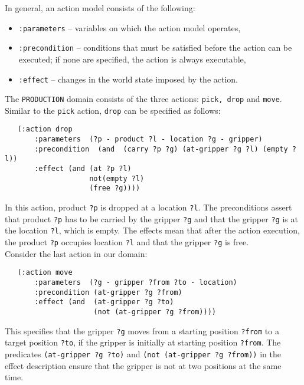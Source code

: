 In general, an action model consists of the following:
\begin{itemize}
\item \texttt{:parameters} -- variables on which the action model operates,
\item \texttt{:precondition} -- conditions that must be satisfied before the action can be executed; if none are specified, the action is always executable,
\item \texttt{:effect} -- changes in the world state imposed by the action.
\end{itemize}
The \texttt{PRODUCTION} domain consists of the three actions: \texttt{pick, drop} and \texttt{move}. Similar to the \texttt{pick} action, \texttt{drop} can be specified as follows:
\begin{verbatim}
   (:action drop
       :parameters  (?p - product ?l - location ?g - gripper)
       :precondition  (and  (carry ?p ?g) (at-gripper ?g ?l) (empty ?l))
       :effect (and (at ?p ?l)
                    not(empty ?l)
                    (free ?g))))
\end{verbatim}
In this action, product \texttt{?p} is dropped at a location \texttt{?l}. The preconditions assert that product \texttt{?p} has to be carried by the gripper \texttt{?g} and that the gripper \texttt{?g} is at the location \texttt{?l}, which is empty.  The effects mean that after the action execution, the product \texttt{?p} occupies location \texttt{?l} and that the gripper \texttt{?g} is free. \\
Consider the last action in our domain:
\begin{verbatim}
   (:action move
       :parameters  (?g - gripper ?from ?to - location)
       :precondition (at-gripper ?g ?from)
       :effect (and  (at-gripper ?g ?to)
                     (not (at-gripper ?g ?from))))
\end{verbatim}
This specifies that the gripper \texttt{?g} moves from a starting position \texttt{?from} to a target position \texttt{?to}, if the gripper is initially at starting position \texttt{?from}. The predicates \texttt{(at-gripper ?g ?to)} and \texttt{(not (at-gripper ?g ?from))} in the effect description ensure that the gripper is not at two positions at the same time.

